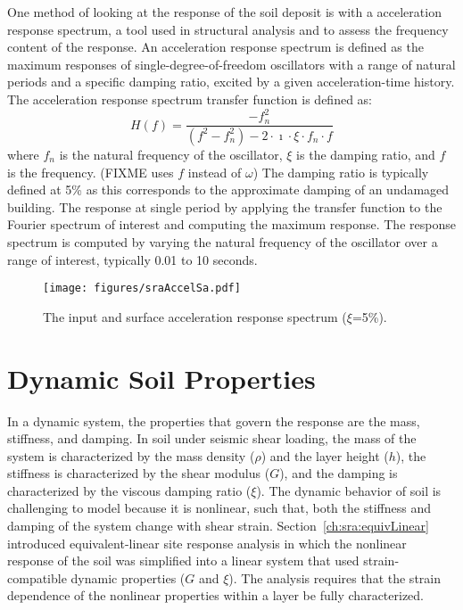 \documentclass[11pt]{report}
\begin{document}
One method of looking at the response of the soil deposit is with a acceleration response
spectrum, a tool used in structural analysis and to assess the frequency
content of the response.  An acceleration response spectrum is defined as the maximum responses of
single-degree-of-freedom oscillators with a range of natural periods and a specific damping ratio,
excited by a given acceleration-time history.  The acceleration response spectrum transfer function
is defined as:
\begin{equation}
	  H(f) = \frac{-f_n^2}{(f^2-f_n^2) - 2 \cdot \imath \cdot \xi \cdot f_n \cdot f}
\end{equation}
where $f_n$ is the natural frequency of the oscillator, $\xi$ is the damping ratio, and $f$ is the
frequency. (FIXME uses $f$ instead of $\omega$) The damping ratio is typically defined at 5\% as
this corresponds to the approximate damping of an undamaged building.  The response at
single period by applying the transfer function to the Fourier spectrum of interest and 
computing the maximum response.  The response spectrum is computed by varying the natural frequency
of the oscillator over a range of interest, typically 0.01 to 10 seconds.

\begin{figure}[tb]
  \begin{center}
	\texttt{[image: figures/sraAccelSa.pdf]}
  \end{center}
  \caption{The input and surface acceleration response spectrum ($\xi$=5\%).}
  \label{fig:sraAccelSa}
\end{figure}

\section{Dynamic Soil Properties}\label{ch:sra:dynprops}
In a dynamic system,  the properties that govern the response are the mass, stiffness, and damping.
In soil under seismic shear loading, the mass of the system is characterized by the mass density
($\rho$) and the layer height ($h$), the stiffness is characterized by the shear modulus ($G$), and
the damping is characterized by the viscous damping ratio ($\xi$).  The dynamic behavior of soil is
challenging to model because it is nonlinear, such that, both the stiffness and damping of the
system change with shear strain.  Section~\ref{ch:sra:equivLinear} introduced equivalent-linear
site response analysis in which the nonlinear response of the soil was simplified into a linear
system that used strain-compatible dynamic properties ($G$ and $\xi$).  The analysis requires that
the strain dependence of the nonlinear properties within a layer be fully characterized.
\end{document}
